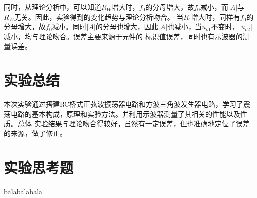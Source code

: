 \documentclass[a4paper,11pt,UTF8]{ctexart}
\begin{document}
  同时，从理论分析中，可以知道$R_W$增大时，$f_0$的分母增大，故$f_0$减小，而$|A|$与$R_W$无关。因此，实验得到的变化趋势与理论分析吻合。
  当$R_1$增大时，同样有$f_0$的分母增大，故$f_0$减小。同时$|A|$的分母也增大，因此$|A|$也减小，当$u_{o1}$不变时，$|u_{o2}|$减小，均与理论吻合。误差主要来源于元件的
  标识值误差，同时也有示波器的测量误差。
\section{实验总结}
本次实验通过搭建RC桥式正弦波振荡器电路和方波三角波发生器电路，学习了震荡电路的基本构成，原理和实验方法。并利用示波器测量了其相关的性能以及性质。总体
实验结果与理论吻合得较好，虽然有一定误差，但也准确地定位了误差的来源，做了修正。
\section{实验思考题}
balabalabala
\end{document}
